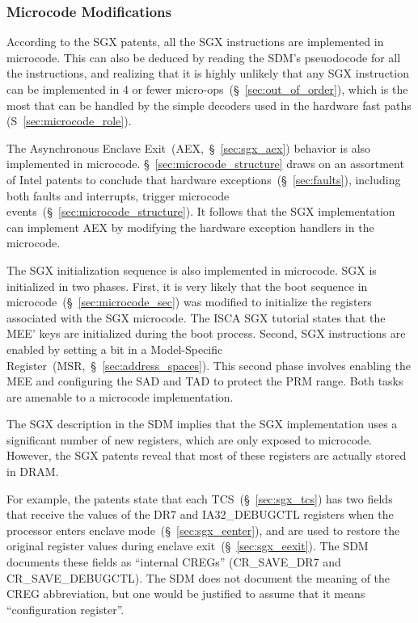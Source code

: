 \subsubsection{Microcode Modifications}
\label{sec:sgx_microcode_modifications}

According to the SGX patents, all the SGX instructions are implemented in
microcode. This can also be deduced by reading the SDM's pseuodocode for all
the instructions, and realizing that it is highly unlikely that any SGX
instruction can be implemented in 4 or fewer
micro-ops~(\S~\ref{sec:out_of_order}), which is the most that can be
handled by the simple decoders used in the hardware fast paths
(S~\ref{sec:microcode_role}).

The Asynchronous Enclave Exit~(AEX,~\S~\ref{sec:sgx_aex}) behavior is also
implemented in microcode. \S~\ref{sec:microcode_structure} draws on an
assortment of Intel patents to conclude that hardware
exceptions~(\S~\ref{sec:faults}), including both faults and interrupts,
trigger microcode events~(\S~\ref{sec:microcode_structure}). It follows that
the SGX implementation can implement AEX by modifying the hardware exception
handlers in the microcode.


The SGX initialization sequence is also implemented in microcode. SGX is
initialized in two phases. First, it is very likely that the boot sequence in
microcode~(\S~\ref{sec:microcode_sec}) was modified to initialize the registers
associated with the SGX microcode. The ISCA SGX tutorial states that the MEE'
keys are initialized during the boot process. Second, SGX instructions are
enabled by setting a bit in a Model-Specific
Register~(MSR,~\S~\ref{sec:address_spaces}). This second phase involves
enabling the MEE and configuring the SAD and TAD to protect the PRM range. Both
tasks are amenable to a microcode implementation.

The SGX description in the SDM implies that the SGX implementation uses a
significant number of new registers, which are only exposed to microcode.
However, the SGX patents reveal that most of these registers are actually
stored in DRAM.


For example, the patents state that each TCS~(\S~\ref{sec:sgx_tcs}) has two
fields that receive the values of the DR7 and IA32\_DEBUGCTL registers when the
processor enters enclave mode~(\S~\ref{sec:sgx_eenter}), and are used to
restore the original register values during enclave
exit~(\S~\ref{sec:sgx_eexit}). The SDM documents these fields as ``internal
CREGs'' (CR\_SAVE\_DR7 and CR\_SAVE\_DEBUGCTL). The SDM does not document the
meaning of the CREG abbreviation, but one would be justified to assume that it
means ``configuration register''.

